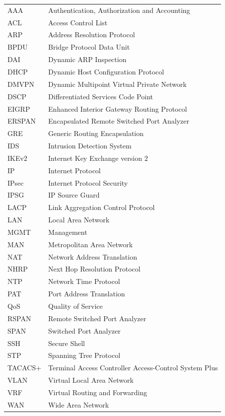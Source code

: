 \begin{longtable}{>{\raggedright\arraybackslash}p{3.8cm}>{\raggedright\arraybackslash}p{9.9cm}}
AAA & Authentication, Authorization and Accounting \\
ACL & Access Control List \\
ARP & Address Resolution Protocol \\
BPDU & Bridge Protocol Data Unit \\
DAI & Dynamic ARP Inspection \\
DHCP & Dynamic Host Configuration Protocol \\
DMVPN & Dynamic Multipoint Virtual Private Network \\
DSCP & Differentiated Services Code Point \\
EIGRP & Enhanced Interior Gateway Routing Protocol \\
ERSPAN & Encapsulated Remote Switched Port Analyzer \\
GRE & Generic Routing Encapsulation \\
IDS & Intrusion Detection System \\
IKEv2 & Internet Key Exchange version 2 \\
IP & Internet Protocol \\
IPsec & Internet Protocol Security \\
IPSG & IP Source Guard \\
LACP & Link Aggregation Control Protocol \\
LAN & Local Area Network \\
MGMT & Management \\
MAN & Metropolitan Area Network \\
NAT & Network Address Translation \\
NHRP & Next Hop Resolution Protocol \\
NTP & Network Time Protocol \\
PAT & Port Address Translation \\
QoS & Quality of Service \\
RSPAN & Remote Switched Port Analyzer \\
SPAN & Switched Port Analyzer \\
SSH & Secure Shell \\
STP & Spanning Tree Protocol \\
TACACS+ & Terminal Access Controller Access-Control System Plus \\
VLAN & Virtual Local Area Network \\
VRF & Virtual Routing and Forwarding \\
WAN & Wide Area Network \\
\bottomrule
\end{longtable}

